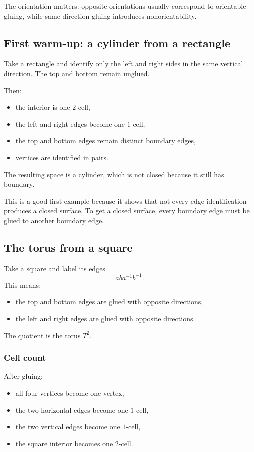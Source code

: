 \documentclass[12pt,a4paper]{article}
\theoremstyle{notespace}
\begin{document}
The orientation matters: opposite orientations usually correspond to orientable gluing, while same-direction gluing introduces nonorientability.

\subsection{First warm-up: a cylinder from a rectangle}

Take a rectangle and identify only the left and right sides in the same vertical direction. The top and bottom remain unglued.

Then:
\begin{itemize}
	\item the interior is one \(2\)-cell,
	\item the left and right edges become one \(1\)-cell,
	\item the top and bottom edges remain distinct boundary edges,
	\item vertices are identified in pairs.
\end{itemize}

The resulting space is a cylinder, which is not closed because it still has boundary.

This is a good first example because it shows that not every edge-identification produces a closed surface. To get a closed surface, every boundary edge must be glued to another boundary edge.

\subsection{The torus from a square}

Take a square and label its edges
\[
aba^{-1}b^{-1}.
\]
This means:
\begin{itemize}
	\item the top and bottom edges are glued with opposite directions,
	\item the left and right edges are glued with opposite directions.
\end{itemize}

The quotient is the torus \(T^2\).

\subsubsection*{Cell count}

After gluing:
\begin{itemize}
	\item all four vertices become one vertex,
	\item the two horizontal edges become one \(1\)-cell,
	\item the two vertical edges become one \(1\)-cell,
	\item the square interior becomes one \(2\)-cell.
\end{itemize}
\end{document}
